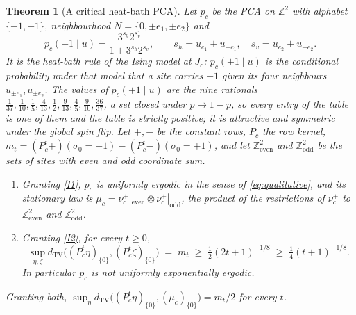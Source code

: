 \documentclass[11pt]{article}
\theoremstyle{plain}
\newtheorem{theorem}{Theorem}[section]
\theoremstyle{definition}
\theoremstyle{remark}
\newcommand{\Z}{\mathbb{Z}}
\newcommand{\dtv}{d_{\mathrm{TV}}}
\begin{document}
\begin{theorem}[A critical heat-bath PCA]
\label{thm:critical}
Let $p_c$ be the PCA on $\Z^2$ with alphabet $\{-1,+1\}$, neighbourhood $N=\{0,\pm e_1,\pm e_2\}$ and
\[
p_c(+1\mid u)=\frac{3^{s_h}2^{s_v}}{1+3^{s_h}2^{s_v}},\qquad s_h=u_{e_1}+u_{-e_1},\quad s_v=u_{e_2}+u_{-e_2}.
\]
It is the heat-bath rule of the Ising model at $J_c$: $p_c(+1\mid u)$ is the conditional probability under that model that a site carries $+1$ given its four neighbours $u_{\pm e_1},u_{\pm e_2}$. The values of $p_c(+1\mid u)$ are the nine rationals $\frac1{37},\frac1{10},\frac15,\frac4{13},\frac12,\frac9{13},\frac45,\frac9{10},\frac{36}{37}$, a set closed under $p\mapsto1-p$, so every entry of the table is one of them and the table is strictly positive; it is attractive and symmetric under the global spin flip. Let $\mathbf+,\mathbf-$ be the constant rows, $P_c$ the row kernel, $m_t=(P_c^t\mathbf+)(\sigma_0=+1)-(P_c^t\mathbf-)(\sigma_0=+1)$, and let $\Z^2_{\mathrm{even}}$ and $\Z^2_{\mathrm{odd}}$ be the sets of sites with even and odd coordinate sum.
\begin{enumerate}[label=(\roman*)]
\item\label{it:c1} Granting \ref{I1}, $p_c$ is uniformly ergodic in the sense of \eqref{eq:qualitative}, and its stationary law is $\mu_c=\nu^+_c|_{\mathrm{even}}\otimes\nu^+_c|_{\mathrm{odd}}$, the product of the restrictions of $\nu^+_c$ to $\Z^2_{\mathrm{even}}$ and $\Z^2_{\mathrm{odd}}$.
\item\label{it:c2} Granting \ref{I2}, for every $t\ge0$,
\begin{equation}
\sup_{\eta,\zeta}\dtv\bigl((P_c^t\eta)_{\{0\}},(P_c^t\zeta)_{\{0\}}\bigr)\;=\;m_t\;\ge\;\tfrac12(2t+1)^{-1/8}\;\ge\;\tfrac14(t+1)^{-1/8}.
\label{eq:critbound}
\end{equation}
In particular $p_c$ is not uniformly exponentially ergodic.
\end{enumerate}
Granting both, $\sup_\eta\dtv\bigl((P_c^t\eta)_{\{0\}},(\mu_c)_{\{0\}}\bigr)=m_t/2$ for every $t$.
\end{theorem}
\end{document}
